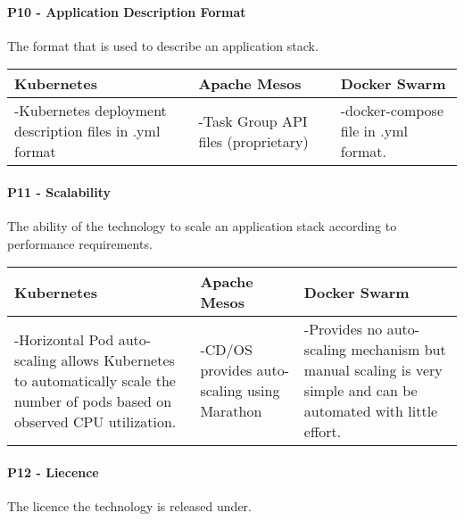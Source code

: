 \paragraph{P10 - Application Description Format}

The format that is used to describe an application stack.

\begin{center}
  \begin{tabular}{ | p{4.5cm} | p{4.5cm} | p{4.5cm} | }
    \hline
    \textbf{Kubernetes}&\textbf{Apache Mesos}&\textbf{Docker Swarm}\\\hline
    -Kubernetes deployment description files in .yml format & 
    
    -Task Group API files (proprietary)& 
    
    -docker-compose file in .yml format. \\
    \hline
  \end{tabular}
\end{center}

\paragraph{P11 - Scalability}

The ability of the technology to scale an application stack according to
performance requirements.

\begin{center}
  \begin{tabular}{ | p{4.5cm} | p{4.5cm} | p{4.5cm} | }
    \hline
    \textbf{Kubernetes}&\textbf{Apache Mesos}&\textbf{Docker Swarm}\\\hline
    -Horizontal Pod auto-scaling allows Kubernetes to automatically scale the
    number of pods based on observed CPU utilization. & 
    
    -CD/OS provides auto-scaling using Marathon & 
    
    -Provides no auto-scaling mechanism but manual scaling is very simple and
    can be automated with little effort.
    \\
    \hline
  \end{tabular}
\end{center}

\paragraph{P12 - Liecence}

The licence the technology is released under.

